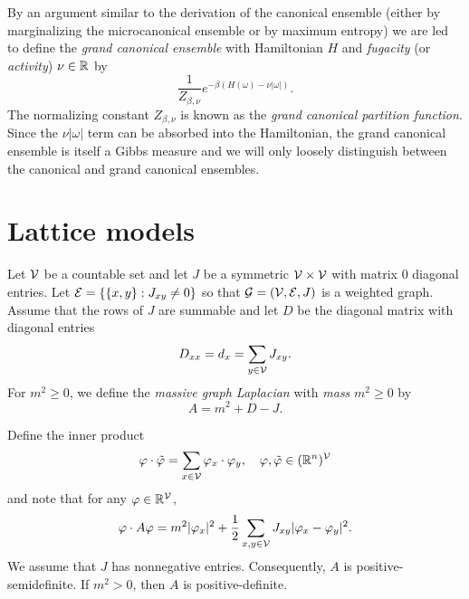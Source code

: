 By an argument similar to the derivation of the canonical ensemble (either by marginalizing
the microcanonical ensemble or by maximum entropy) we are led to define the \emph{grand
canonical ensemble} with Hamiltonian $H$ and \emph{fugacity} (or \emph{activity}) $\nu \in {\mathbb R}$ by
\begin{equation}
\frac{1}{Z_{\beta,\nu}} e^{-\beta (H(\omega) - \nu |\omega|)}.
\end{equation}
The normalizing constant $Z_{\beta,\nu}$ is known as the \emph{grand canonical partition function}.
Since the $\nu |\omega|$ term can be absorbed into the Hamiltonian,
the grand canonical ensemble is itself a Gibbs measure and we will only loosely
distinguish between the canonical and grand canonical ensembles. 


\section{Lattice models}


Let $\mathcal{V}$ be a countable set and let $J$ be a symmetric $\mathcal{V}\times\mathcal{V}$
with matrix $0$ diagonal entries. Let $\mathcal{E} = \{ \{ x, y \} : J_{xy} \ne 0 \}$ so that
$\mathcal{G} = (\mathcal{V}, \mathcal{E}, J)$ is a weighted graph. Assume that the rows of $J$ are
summable and let $D$ be the diagonal matrix with diagonal entries
\begin{equation}
D_{xx} = d_x = \sum_{y\in\mathcal{V}} J_{xy}.
\end{equation}
For $m^2 \ge 0$, we define the \emph{massive graph Laplacian} with \emph{mass} $m^2 \ge 0$
by
\begin{equation}
A = m^2 + D - J.
\end{equation}

Define the inner product
\begin{equation}
\varphi\cdot\tilde\varphi = \sum_{x\in\mathcal{V}} \varphi_x \cdot \varphi_y,
  \quad
\varphi, \tilde\varphi \in ({\mathbb R}^n)^{\mathcal{V}}
\end{equation}
and note that for any $\varphi\in{\mathbb R}^{\mathcal{V}}$,
\begin{equation}
\varphi \cdot A \varphi
  =
m^2 |\varphi_x|^2
  +
\frac{1}{2} \sum_{x,y\in\mathcal{V}} J_{xy} |\varphi_x - \varphi_y|^2.
\end{equation}
We assume that $J$ has nonnegative entries. Consequently, $A$ is positive-semidefinite.
If $m^2 > 0$, then $A$ is positive-definite.

